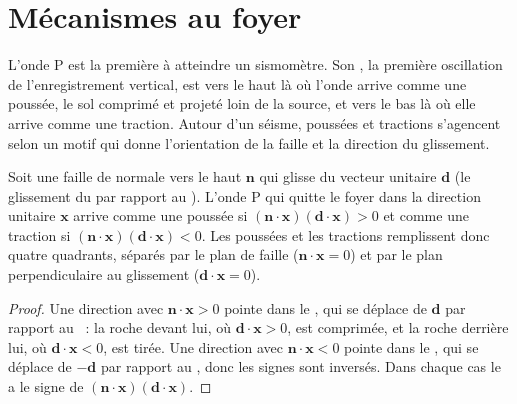 \section{Mécanismes au foyer}\label{sec:b1:earthquake-source:focal}

L'onde P est la première à atteindre un sismomètre. Son , la première
oscillation de l'enregistrement vertical, est vers le haut là où l'onde arrive comme une poussée, le
sol comprimé et projeté loin de la source, et vers le bas là où elle arrive
comme une traction. Autour d'un séisme, poussées et tractions s'agencent selon un motif
qui donne l'orientation de la faille et la direction du glissement.

\begin{proposition}\label{prop:b1:earthquake-source:first-motion}
Soit une faille de normale vers le haut $\mathbf n$ qui glisse du vecteur unitaire $\mathbf d$
(le glissement du  par rapport au ). L'onde P qui quitte
le foyer dans la direction unitaire $\mathbf x$ arrive comme une poussée si
$(\mathbf n\cdot\mathbf x)(\mathbf d\cdot\mathbf x) > 0$ et comme une traction si
$(\mathbf n\cdot\mathbf x)(\mathbf d\cdot\mathbf x) < 0$. Les poussées et les
tractions remplissent donc quatre quadrants, séparés par le plan de faille
($\mathbf n\cdot\mathbf x = 0$) et par le plan perpendiculaire au glissement
($\mathbf d\cdot\mathbf x = 0$).
\end{proposition}

\begin{proof}
Une direction avec $\mathbf n\cdot\mathbf x > 0$ pointe dans le ,
qui se déplace de $\mathbf d$ par rapport au ~: la roche devant lui,
où $\mathbf d\cdot\mathbf x > 0$, est comprimée, et la roche derrière lui,
où $\mathbf d\cdot\mathbf x < 0$, est tirée. Une direction avec
$\mathbf n\cdot\mathbf x < 0$ pointe dans le , qui se déplace de
$-\mathbf d$ par rapport au , donc les signes sont inversés. Dans chaque
cas le  a le signe de $(\mathbf n\cdot\mathbf x)(\mathbf
d\cdot\mathbf x)$.
\end{proof}

